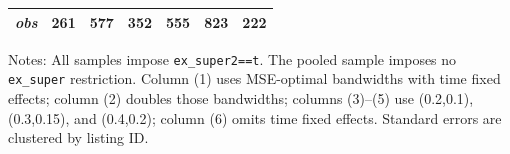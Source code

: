 \begin{table}[!htbp]
\begin{tabular}{lcccccc}
\textit{obs} & 261 & 577 & 352 & 555 & 823 & 222 \\
\bottomrule
\end{tabular}
\begin{minipage}{0.98\textwidth}\footnotesize
Notes: All samples impose \texttt{ex\_super2==t}. The pooled sample imposes no \texttt{ex\_super} restriction. Column (1) uses MSE-optimal bandwidths with time fixed effects; column (2) doubles those bandwidths; columns (3)--(5) use (0.2,0.1), (0.3,0.15), and (0.4,0.2); column (6) omits time fixed effects. Standard errors are clustered by listing ID.
\end{minipage}
\end{table}

